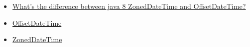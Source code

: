 \documentclass[12pt]{article}
\begin{document}
\begin{itemize}
\tightlist
\item
  \href{https://stackoverflow.com/questions/30234594/whats-the-difference-between-java-8-zoneddatetime-and-offsetdatetime}{What's the difference between java 8 ZonedDateTime and OffsetDateTime?}
\item
  \href{https://docs.oracle.com/javase/8/docs/api/java/time/OffsetDateTime.html}{OffsetDateTime}
\item
  \href{https://docs.oracle.com/javase/8/docs/api/java/time/ZonedDateTime.html}{ZonedDateTime}
\end{itemize}
\end{document}
